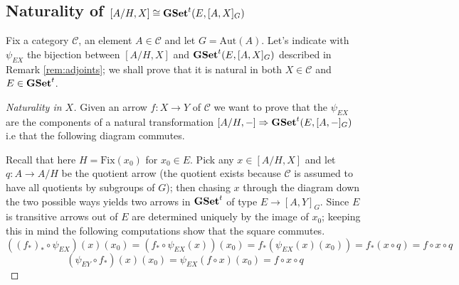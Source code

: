 \documentclass[italian, 12pt, reqno]{article}
\theoremstyle{myteo}
\numberwithin{equation}{section}
\newcommand{\cat}[1]{\mathscr{#1}}
\newcommand{\aut}{\text{Aut}}
\newcommand{\tgset}{\text{\textbf{GSet}}^t}
\newcommand{\fix}[1]{\text{Fix}(#1)}
\newcommand{\homs}[2]{[#1, #2]}
\newcommand{\fun}[3]{#1\colon#2\to #3}
\begin{document}
\subsection{Naturality of \(\homs{A/H}{X} \cong \tgset(E, \homs{A}{X}_G)\)}
Fix a category \(\cat{C}\), an element \(A\in\cat{C}\) and let \(G = \aut(A)\).
Let's indicate with \(\psi_{EX}\) the bijection between \(\homs{A/H}{X}\) and \(\tgset(E, \homs{A}{X}_G)\) described in Remark \ref{rem:adjoints}; we shall prove that it is natural in both \(X\in\cat{C}\) and \(E\in\tgset\).

\begin{proof}[Naturality in \(X\)]
  \label{proof:naturality_in_X}
  Given an arrow \(\fun{f}{X}{Y}\) of \(\cat{C}\) we want to prove that the \(\psi_{EX}\) are the components of a natural transformation \(\homs{A/H}{-}\Rightarrow \tgset(E, \homs{A}{-}_G)\) i.e that the following diagram commutes.
  \begin{center}
  \end{center}
  Recall that here \(H = \fix{x_0}\) for \(x_0\in E\).
  Pick any \(x\in \homs{A/H}{X}\) and let \(\fun{q}{A}{A/H}\) be the quotient arrow (the quotient exists because \(\cat{C}\) is assumed to have all quotients by subgroups of \(G\)); then chasing \(x\) through the diagram down the two possible ways yields two arrows in \(\tgset\) of type \(E\to\homs{A}{Y}_G\).
  Since \(E\) is transitive arrows out of \(E\) are determined uniquely by the image of \(x_0\); keeping this in mind the following computations show that the square commutes.
  \[((f_*)_*\circ \psi_{EX})(x)(x_0) = (f_*\circ \psi_{EX}(x))(x_0) = f_*(\psi_{EX}(x)(x_0)) = f_*(x\circ q) = f\circ x\circ q\]
  \[(\psi_{EY}\circ f_*)(x)(x_0) = \psi_{EX}(f\circ x)(x_0) = f\circ x\circ q\]
\end{proof}
\end{document}
